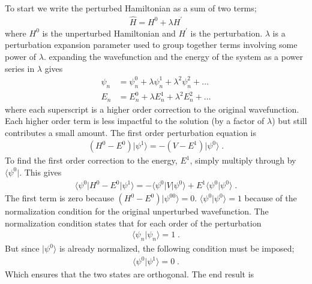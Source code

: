         \noindent To start we write the perturbed Hamiltonian as a sum of two terms;
        \begin{align}
            \hat{H} = H^0 + \lambda H^\prime
        \end{align}
        \noindent where $H^0$ is the unperturbed Hamiltonian and $H^\prime$ is the perturbation. $\lambda$ is a perturbation expansion parameter used to group together terms involving some power of $\lambda$. expanding the wavefunction and the energy of the system as a power series in $\lambda$ gives \cite{Griffiths_2018}
        \begin{align}
            \psi_n &= \psi_n^0 + \lambda \psi_n^1 + \lambda^2 \psi_n^2 + \dots\\
            E_n &= E_n^0 + \lambda E_n^1 + \lambda^2 E_n^2 + \dots
        \end{align}
        \noindent where each superscript is a higher order correction to the original wavefunction. Each higher order term is less impactful to the solution (by a factor of $\lambda$) but still contributes a small amount. The first order perturbation equation is
        \begin{align}
            \left( H^0 - E^0 \right) \vert \psi^1 \rangle = -\left(V - E^1 \right) \vert \psi^0 \rangle\;.
        \end{align}
        \noindent To find the first order correction to the energy, $E^1$, simply multiply through by $\langle \psi^0 \vert$. This gives
        \begin{align}
            \langle \psi^0 \vert H^0 - E^0 \vert \psi^1 \rangle = -\langle \psi^0 \vert V \vert \psi^0 \rangle +E^1 \langle \psi^0  \vert \psi^0 \rangle\;.
        \end{align}
        \noindent The first term is zero because $\left(H^0 - E^0\right)\vert \psi^00 \rangle = 0$. $\langle \psi^0 \vert \psi^0 \rangle = 1$ because of the normalization condition for the original unperturbed wavefunction. The normalization condition states that for each order of the perturbation 
        \begin{align}
            \langle \psi_n \vert \psi_n \rangle = 1\;.
        \end{align}
        \noindent But since $\vert \psi^0 \rangle$ is already normalized, the following condition must be imposed;
        \begin{align}
            \langle \psi^0 \vert \psi^1 \rangle = 0\;.
        \end{align}
        \noindent Which ensures that the two states are orthogonal. The end result is
